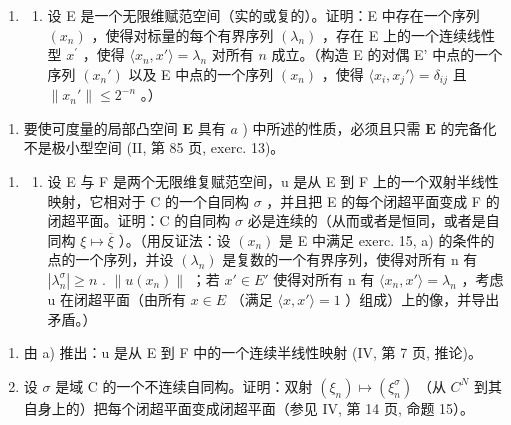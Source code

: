\begin{enumerate}
\def\labelenumi{\arabic{enumi})}
\setcounter{enumi}{14}
\tightlist
\item
  \begin{enumerate}
  \def\labelenumii{\alph{enumii})}
  \tightlist
  \item
    设 E 是一个无限维赋范空间（实的或复的）。证明：E 中存在一个序列 \((x_{n})\) ，使得对标量的每个有界序列 \((\lambda_{n})\) ，存在 E 上的一个连续线性型 \(x^{\prime}\) ，使得 \(\langle x_n,x'\rangle = \lambda_n\) 对所有 \(n\) 成立。（构造 E 的对偶 E' 中点的一个序列 \((x_n')\) 以及 E 中点的一个序列 \((x_{n})\) ，使得 \(\langle x_i,x_j'\rangle = \delta_{ij}\) 且 \(\| x_n'\| \leqslant 2^{-n}\) 。）
  \end{enumerate}
\end{enumerate}

\begin{enumerate}
\def\labelenumi{\alph{enumi})}
\setcounter{enumi}{1}
\tightlist
\item
  要使可度量的局部凸空间 \(\mathbf{E}\) 具有 \(a\) ) 中所述的性质，必须且只需 \(\mathbf{E}\) 的完备化不是极小型空间 (II, 第 85 页, exerc. 13)。
\end{enumerate}

\begin{enumerate}
\def\labelenumi{\arabic{enumi})}
\setcounter{enumi}{15}
\tightlist
\item
  \begin{enumerate}
  \def\labelenumii{\alph{enumii})}
  \tightlist
  \item
    设 E 与 F 是两个无限维复赋范空间，u 是从 E 到 F 上的一个双射半线性映射，它相对于 C 的一个自同构 \(\sigma\) ，并且把 E 的每个闭超平面变成 F 的闭超平面。证明：C 的自同构 \(\sigma\) 必是连续的（从而或者是恒同，或者是自同构 \(\xi \mapsto \overline{\xi}\) ）。（用反证法：设 \((x_{n})\) 是 E 中满足 exerc. 15, a) 的条件的点的一个序列，并设 \((\lambda_{n})\) 是复数的一个有界序列，使得对所有 n 有 \(|\lambda_{n}^{\sigma}| \geqslant n\) . \(\|u(x_{n})\|\) ；若 \(x' \in E'\) 使得对所有 n 有 \(\langle x_{n}, x' \rangle = \lambda_{n}\) ，考虑 u 在闭超平面（由所有 \(x \in E\) （满足 \(\langle x, x' \rangle = 1\) ）组成）上的像，并导出矛盾。）
  \end{enumerate}
\end{enumerate}

\begin{enumerate}
\def\labelenumi{\alph{enumi})}
\setcounter{enumi}{1}
\tightlist
\item
  由 a) 推出：u 是从 E 到 F 中的一个连续半线性映射 (IV, 第 7 页, 推论)。
\item
  设 \(\sigma\) 是域 C 的一个不连续自同构。证明：双射 \((\xi_{n})\mapsto(\xi_{n}^{\sigma})\) （从 \(C^{N}\) 到其自身上的）把每个闭超平面变成闭超平面（参见 IV, 第 14 页, 命题 15）。
\end{enumerate}

